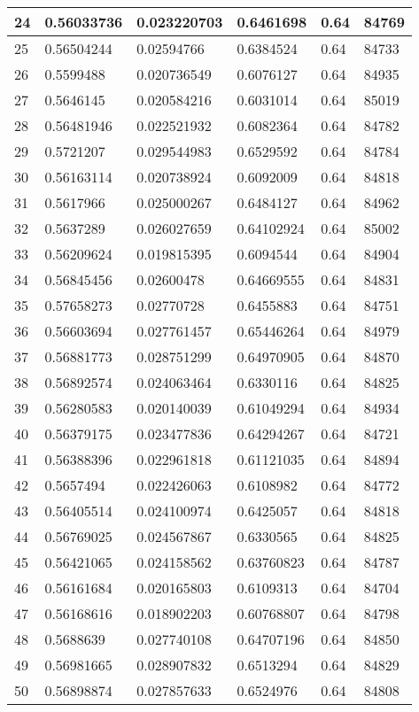 \begin{longtable}{|l|l|l|l|l|l|}
24 & 0.56033736 & 0.023220703 & 0.6461698 & 0.64 & 84769 \\ \hline 
25 & 0.56504244 & 0.02594766 & 0.6384524 & 0.64 & 84733 \\ \hline 
26 & 0.5599488 & 0.020736549 & 0.6076127 & 0.64 & 84935 \\ \hline 
27 & 0.5646145 & 0.020584216 & 0.6031014 & 0.64 & 85019 \\ \hline 
28 & 0.56481946 & 0.022521932 & 0.6082364 & 0.64 & 84782 \\ \hline 
29 & 0.5721207 & 0.029544983 & 0.6529592 & 0.64 & 84784 \\ \hline 
30 & 0.56163114 & 0.020738924 & 0.6092009 & 0.64 & 84818 \\ \hline 
31 & 0.5617966 & 0.025000267 & 0.6484127 & 0.64 & 84962 \\ \hline 
32 & 0.5637289 & 0.026027659 & 0.64102924 & 0.64 & 85002 \\ \hline 
33 & 0.56209624 & 0.019815395 & 0.6094544 & 0.64 & 84904 \\ \hline 
34 & 0.56845456 & 0.02600478 & 0.64669555 & 0.64 & 84831 \\ \hline 
35 & 0.57658273 & 0.02770728 & 0.6455883 & 0.64 & 84751 \\ \hline 
36 & 0.56603694 & 0.027761457 & 0.65446264 & 0.64 & 84979 \\ \hline 
37 & 0.56881773 & 0.028751299 & 0.64970905 & 0.64 & 84870 \\ \hline 
38 & 0.56892574 & 0.024063464 & 0.6330116 & 0.64 & 84825 \\ \hline 
39 & 0.56280583 & 0.020140039 & 0.61049294 & 0.64 & 84934 \\ \hline 
40 & 0.56379175 & 0.023477836 & 0.64294267 & 0.64 & 84721 \\ \hline 
41 & 0.56388396 & 0.022961818 & 0.61121035 & 0.64 & 84894 \\ \hline 
42 & 0.5657494 & 0.022426063 & 0.6108982 & 0.64 & 84772 \\ \hline 
43 & 0.56405514 & 0.024100974 & 0.6425057 & 0.64 & 84818 \\ \hline 
44 & 0.56769025 & 0.024567867 & 0.6330565 & 0.64 & 84825 \\ \hline 
45 & 0.56421065 & 0.024158562 & 0.63760823 & 0.64 & 84787 \\ \hline 
46 & 0.56161684 & 0.020165803 & 0.6109313 & 0.64 & 84704 \\ \hline 
47 & 0.56168616 & 0.018902203 & 0.60768807 & 0.64 & 84798 \\ \hline 
48 & 0.5688639 & 0.027740108 & 0.64707196 & 0.64 & 84850 \\ \hline 
49 & 0.56981665 & 0.028907832 & 0.6513294 & 0.64 & 84829 \\ \hline 
50 & 0.56898874 & 0.027857633 & 0.6524976 & 0.64 & 84808 \\ \hline 
\end{longtable}